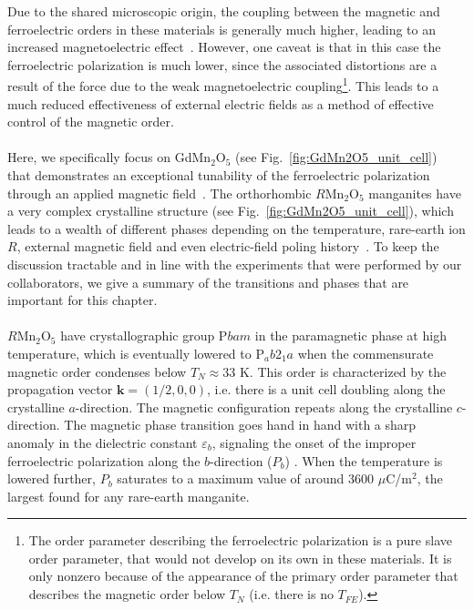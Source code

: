 Due to the shared microscopic origin, the coupling between the magnetic and ferroelectric orders in these materials is generally much higher, leading to an increased magnetoelectric effect~\cite{Oh2014,Radaelli08Y}.
However, one caveat is that in this case the ferroelectric polarization is much lower, since the associated distortions are a result of the force due to the weak magnetoelectric coupling\footnote{The order parameter describing the ferroelectric polarization is a pure slave order parameter, that would not develop on its own in these materials. It is only nonzero because of the appearance of the primary order parameter that describes the magnetic order below $T_N$ (i.e. there is no $T_{FE}$).}.
This leads to a much reduced effectiveness of external electric fields as a method of effective control of the magnetic order.  
\\\\
Here, we specifically focus on GdMn$_2$O$_5$ (see Fig.~\ref{fig:GdMn2O5_unit_cell})~\cite{Khomskii2009} that demonstrates an exceptional tunability of the ferroelectric polarization through an applied magnetic field~\cite{Lee13}.
The orthorhombic $R$Mn$_2$O$_5$ manganites have a very complex crystalline structure (see Fig.~\ref{fig:GdMn2O5_unit_cell}), which leads to a wealth of different phases depending on the temperature, rare-earth ion $R$, external magnetic field and even electric-field poling history~\cite{Chapon04, Chapon06, Blake05, Radaelli09,Radaelli08, Zheng2019}.
To keep the discussion tractable and in line with the experiments that were performed by our collaborators, we give a summary of the transitions and phases that are important for this chapter.
\\\\
$R$Mn$_2$O$_5$ have crystallographic group P$bam$ \cite{Alonso97} in the paramagnetic phase at high temperature, which is eventually lowered to P$_ab2_1a$ when the commensurate magnetic order condenses below $T_{N} \approx 33$ K.
This order is characterized by the propagation vector $\bm{k} = (1/2, 0, 0)$, i.e. there is a unit cell doubling along the crystalline $a$-direction.
The magnetic configuration repeats along the crystalline $c$-direction. The magnetic phase transition goes hand in hand with a sharp anomaly in the dielectric constant $\varepsilon_b$, signaling the onset of the improper ferroelectric polarization  along the $b$-direction ($P_b$) \cite{Vecchini08,Lee13,Vecchini14}.
When the temperature is lowered further, $P_b$ saturates to a maximum value of around 3600 $\mu$C/m$^2$, the largest found for any rare-earth manganite.
